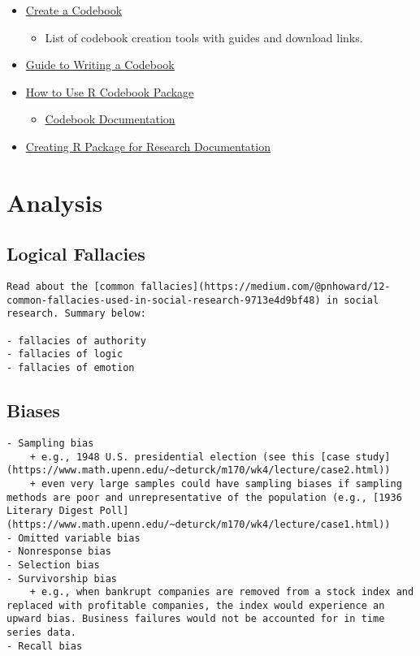 \documentclass[]{book}
\providecommand{\tightlist}{%
  \setlength{\itemsep}{0pt}\setlength{\parskip}{0pt}}
\begin{document}
\begin{itemize}
\item
  \href{http://www.ddialliance.org/training/getting-started-new-content/create-a-codebook}{Create a Codebook}

  \begin{itemize}
  \tightlist
  \item
    List of codebook creation tools with guides and download links.
  \end{itemize}
\item
  \href{http://www.medicine.mcgill.ca/epidemiology/joseph/pbelisle/CodebookCookbook/CodebookCookbook.pdf}{Guide to Writing a Codebook}
\item
  \href{https://osf.io/zrsxd/download/}{How to Use R Codebook Package}

  \begin{itemize}
  \tightlist
  \item
    \href{https://rubenarslan.github.io/codebook/}{Codebook Documentation}
  \end{itemize}
\item
  \href{https://rpubs.com/YaRrr/rpackageintro}{Creating R Package for Research Documentation}
\end{itemize}

\hypertarget{analysis}{%
\chapter{Analysis}\label{analysis}}

\hypertarget{logical-fallacies}{%
\section{Logical Fallacies}\label{logical-fallacies}}

\begin{verbatim}
Read about the [common fallacies](https://medium.com/@pnhoward/12-common-fallacies-used-in-social-research-9713e4d9bf48) in social research. Summary below:

- fallacies of authority
- fallacies of logic
- fallacies of emotion
\end{verbatim}

\hypertarget{biases}{%
\section{Biases}\label{biases}}

\begin{verbatim}
- Sampling bias
    + e.g., 1948 U.S. presidential election (see this [case study](https://www.math.upenn.edu/~deturck/m170/wk4/lecture/case2.html))
    + even very large samples could have sampling biases if sampling methods are poor and unrepresentative of the population (e.g., [1936 Literary Digest Poll](https://www.math.upenn.edu/~deturck/m170/wk4/lecture/case1.html))
- Omitted variable bias
- Nonresponse bias
- Selection bias
- Survivorship bias
    + e.g., when bankrupt companies are removed from a stock index and replaced with profitable companies, the index would experience an upward bias. Business failures would not be accounted for in time series data.
- Recall bias
\end{verbatim}
\end{document}
